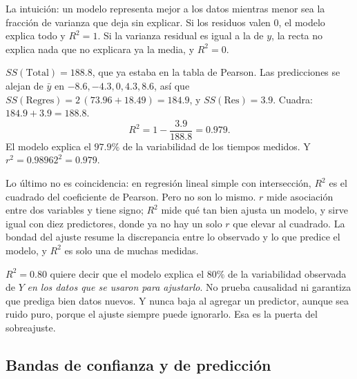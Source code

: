\documentclass[11pt,letterpaper]{article}
\begin{document}
La intuición: un modelo representa mejor a los datos mientras menor sea
la fracción de varianza que deja sin explicar. Si los residuos valen
$0$, el modelo explica todo y $R^2 = 1$. Si la varianza residual es
igual a la de $y$, la recta no explica nada que no explicara ya la
media, y $R^2 = 0$.

\begin{ejemplo}
    $SS(\mathrm{Total}) = 188.8$, que ya estaba en la tabla de Pearson.
    Las predicciones se alejan de $\bar{y}$ en $-8.6, -4.3, 0, 4.3,
    8.6$, así que $SS(\mathrm{Regres}) = 2\,(73.96 + 18.49) = 184.9$, y
    $SS(\mathrm{Res}) = 3.9$. Cuadra: $184.9 + 3.9 = 188.8$.
    \[
        R^2 = 1 - \frac{3.9}{188.8} = 0.979 .
    \]
    El modelo explica el $97.9\%$ de la variabilidad de los tiempos
    medidos. Y $r^2 = 0.98962^2 = 0.979$.
\end{ejemplo}

Lo último no es coincidencia: en regresión lineal simple con
intersección, $R^2$ es el cuadrado del coeficiente de Pearson. Pero no
son lo mismo. $r$ mide asociación entre dos variables y tiene signo;
$R^2$ mide qué tan bien ajusta un modelo, y sirve igual con diez
predictores, donde ya no hay un solo $r$ que elevar al cuadrado. La
bondad del ajuste resume la discrepancia entre lo observado y lo que
predice el modelo, y $R^2$ es solo una de muchas medidas.

\begin{ojo}
    $R^2 = 0.80$ quiere decir que el modelo explica el $80\%$ de la
    variabilidad observada de $Y$ \emph{en los datos que se usaron para
    ajustarlo}. No prueba causalidad ni garantiza que prediga bien
    datos nuevos. Y nunca baja al agregar un predictor, aunque sea
    ruido puro, porque el ajuste siempre puede ignorarlo. Esa es la
    puerta del sobreajuste.
\end{ojo}


\subsection*{Bandas de confianza y de predicción}
\end{document}

